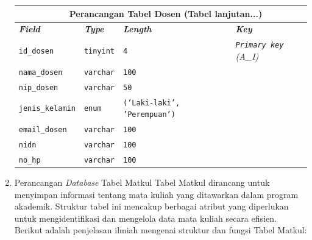 \begin{enumerate}
{\begin{longtable}{p{3 cm} p{3cm} p{3 cm} p{3.4 cm}}
				      \multicolumn{4}{c}{\tablename\ \thetable\ {Perancangan Tabel Dosen} \space (Tabel lanjutan...)}                               \\
				      \hline
				      \textbf{\textit{Field}} & \textbf{\textit{Type}} & \textbf{\textit{Length}}            & \textbf{\textit{Key}}                \\
				      \hline
				      \endhead

				      \texttt{id\_dosen}      & \texttt{tinyint}       & \texttt{4}                          & \textit{\texttt{Primary key} (A\_I)} \\
				      \texttt{nama\_dosen}    & \texttt{varchar}       & \texttt{100}                        &                                      \\
				      \texttt{nip\_dosen}     & \texttt{varchar}       & \texttt{50}                         &                                      \\
				      \texttt{jenis\_kelamin} & \texttt{enum}          & \texttt{('Laki-laki', 'Perempuan')} &                                      \\
				      \texttt{email\_dosen}   & \texttt{varchar}       & \texttt{100}                        &                                      \\
				      \texttt{nidn}           & \texttt{varchar}       & \texttt{100}                        &                                      \\
				      \texttt{no\_hp}         & \texttt{varchar}       & \texttt{100}                        &                                      \\
				      \hline
			      \end{longtable}
		      }

	\item Perancangan \textit{Database} Tabel Matkul
	      Tabel Matkul dirancang untuk menyimpan informasi tentang mata kuliah yang ditawarkan dalam program akademik. Struktur tabel ini mencakup berbagai atribut yang diperlukan untuk mengidentifikasi dan mengelola data mata kuliah secara efisien. Berikut adalah penjelasan ilmiah mengenai struktur dan fungsi Tabel Matkul:


\end{enumerate}

